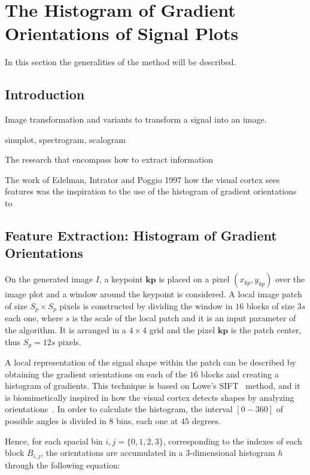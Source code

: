 \chapter{The Histogram of Gradient Orientations of Signal Plots}
\label{chapter:three}
In this section the generalities of the method will be described.

\section{Introduction}

Image transformation and variants to transform a signal into an image.

sinuplot, spectrogram, scalogram


The research that encompass how to extract information 

The work of Edelman, Intrator and Poggio 1997 how the visual cortex sees features was the inspiration to the use of the histogram of gradient orientations to 

\section{Feature Extraction: Histogram of Gradient Orientations}
\label{SIFT}


On the generated image $I$, a keypoint $\mathbf{kp}$ is placed on a pixel $(x_{kp}, y_{kp})$ over the image plot and a window around the keypoint is considered. A local image patch of size $S_p \times S_p$ pixels is constructed by dividing the window in $16$ blocks of size $3s$ each one,  where $s$ is the scale of the local patch and it is an input parameter of the algorithm. It is arranged in a $4 \times 4$ grid and the pixel $ \mathbf{kp}$ is the patch center, thus $S_p = 12s $ pixels. 

A local representation of the signal shape within the patch can be described by obtaining the gradient orientations on each of the $16$ blocks and creating a histogram of gradients.  This technique is based on Lowe's SIFT~\cite{Lowe2004} method, and it is biomimetically inspired in how the visual cortex detects shapes by analyzing orientations~\cite{cogprints561}.   In order to calculate the histogram, the interval $[0-360]$ of possible angles is divided in $8$ bins, each one at $45$ degrees.

 Hence, for each spacial bin $ i,j = \{0,1,2,3\} $, corresponding to the indexes of each block $B_{i,j}$,  the orientations are accumulated in a  $3$-dimensional histogram $h$ through the following equation: 
 

